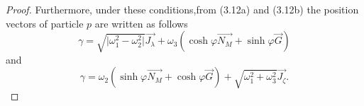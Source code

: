 \documentclass[10pt,a4paper]{amsart}
\begin{document}
\begin{proof}
Furthermore, under these conditions,from (3.12a) and (3.12b) the position
vectors of particle $p$ are written as follows%
\begin{equation}
\gamma =\sqrt{\vert\omega _{1}^{2}-\omega _{2}^{2}\vert}\overrightarrow{J_{\lambda }}%
+\omega _{3}\left( \cosh \varphi \overrightarrow{N_{M}}+\sinh \varphi 
\overrightarrow{G}\right)  \tag{2.27}
\end{equation}%
and%
\begin{equation}
\gamma =\omega _{2}\left( \sinh \varphi \overrightarrow{N_{M}}+\cosh \varphi 
\overrightarrow{G}\right) +\sqrt{\omega _{1}^{2}+\omega _{3}^{2}}%
\overrightarrow{J_{\zeta }}.  \tag{3.28}
\end{equation}
\end{proof}
\end{document}
